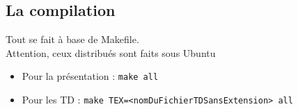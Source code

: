 \documentclass[./beamerCoursIsenLaTeX.tex]{subfiles}
\begin{document}
\subsection{La compilation}
\begin{frame}
\center Tout se fait à base de Makefile.\\Attention, ceux distribués sont faits sous Ubuntu\\
\begin{itemize}
\item Pour la présentation : \texttt{make all}
\item Pour les TD : \texttt{make TEX=<nomDuFichierTDSansExtension> all}
\end{itemize}

\end{frame}
\end{document}
